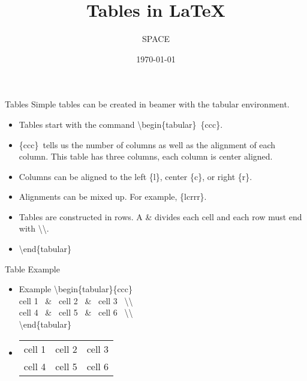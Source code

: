 \documentclass{beamer}
\title{Tables in \LaTeX}
\author{SPACE}
\date{\today}
\begin{document}
\maketitle
\begin{frame}{Tables}
Simple tables can be created in beamer with the tabular environment.
\begin{itemize}
\pause \item Tables start with the command \textbackslash begin\{tabular\}~\{ccc\}.
\pause \item \{ccc\}~tells us the number of columns as well as the alignment
of each column. This table has three columns, each column is
center aligned.
\pause \item Columns can be aligned to the left \{l\}, center \{c\}, or right \{r\}.
\pause \item Alignments can be mixed up. For example, \{lcrrr\}.
\pause \item Tables are constructed in rows. A \& divides each cell and each
row must end with \textbackslash \textbackslash.
\pause \item \textbackslash end\{tabular\}
\end{itemize}
\end{frame}

\begin{frame}{Table Example}
\begin{itemize}
\pause \item[]\begin{block}{Example}
\textbackslash begin\{tabular\}\{ccc\}\\
cell 1 ~\&~ cell 2~ \&~ cell 3 ~\textbackslash \textbackslash~~\\
cell 4 ~\&~ cell 5~ \&~ cell 6 ~\textbackslash \textbackslash~~\\
\textbackslash end\{tabular\}
\end{block}
\vspace{0.2cm}
\pause \item[]\begin{tabular}{ccc}
cell 1 & cell 2 & cell 3 \\
cell 4 & cell 5 & cell 6 \\
\end{tabular}
\end{itemize}
\end{frame}
\end{document}

